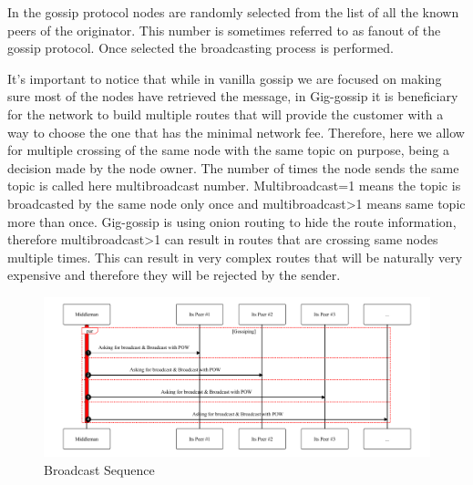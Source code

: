 \documentclass{article}
\begin{document}
In the gossip protocol nodes are randomly selected from the list of all the known peers of the originator. This number is sometimes referred to as fanout \cite{Fanout} of the gossip protocol. Once selected the broadcasting process is performed.

It's important to notice that while in vanilla gossip we are focused on making sure most of the nodes have retrieved the message, in Gig-gossip it is beneficiary for the network to build multiple routes that will provide the customer with a way to choose the one that has the minimal network fee. Therefore, here we allow for multiple crossing of the same node with the same topic on purpose, being a decision made by the node owner. The number of times the node sends the same topic is called here multibroadcast number. Multibroadcast=1 means the topic is broadcasted by the same node only once and multibroadcast>1 means same topic more than once. Gig-gossip is using onion routing to hide the route information, therefore multibroadcast>1 can result in routes that are crossing same nodes multiple times. This can result in very complex routes that will be naturally very expensive and therefore they will be rejected by the sender.

\begin{figure}
	\centering
	\includegraphics[scale=0.8]{BroadcastSequence.pdf}
	\caption{Broadcast Sequence}
	\label{fig:fr:broadcastsequence}
\end{figure}
\end{document}
